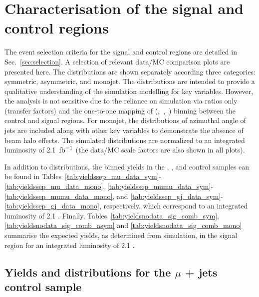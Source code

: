 \section{Characterisation of the signal and control regions}
\label{sec:yields}

The event selection criteria for the signal and control regions are
detailed in Sec.~\ref{sec:selection}. A selection of relevant data/MC
comparison plots are presented here. The distributions are shown
separately according three \njet categories: symmetric, asymmetric,
and monojet. The distributions are intended to provide a qualitative
understanding of the simulation modelling for key variables. However, 
the analysis is not sensitive due to the reliance on simulation via
ratios only (\ie transfer factors) and the one-to-one mapping of
(\njet,~\nb,~\scalht) binning between the control and signal
regions. For monojet, the distributions of azimuthal angle of jets are 
included along with other key variables to demonstrate the absence of 
beam halo effects. The simulated distributions are normalized to an integrated
luminosity of 2.1~$\text{fb}^{-1}$ (the data/MC scale factors are also shown
in all plots).

In addition to distributions, the binned yields in the \mj, \mmj, and
\gj control samples can be found in
Tables~\ref{tab:yieldssep_mu_data_sym}-\ref{tab:yieldssep_mu_data_mono},
\ref{tab:yieldssep_mumu_data_sym}-\ref{tab:yieldssep_mumu_data_mono},
and \ref{tab:yieldssep_gj_data_sym}-\ref{tab:yieldssep_gj_data_mono},
respectively, which correspond to an integrated luminosity of 2.1
\ifb. 
Finally, Tables~\ref{tab:yieldsnodata_sig_comb_sym},
\ref{tab:yieldsnodata_sig_comb_asym} and \ref{tab:yieldsnodata_sig_comb_mono} summarise the expected yields, as
determined from simulation, in the signal region for an integrated
luminosity of 2.1 \ifb.

\clearpage
\subsection{Yields and distributions for the $\mu$ + jets control sample}





